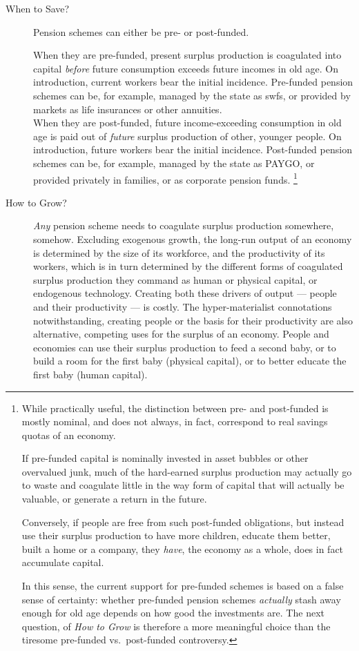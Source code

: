 \begin{description}
	\item[When to Save?]
	Pension schemes can either be pre- or post-funded.

	When they are pre-funded, present surplus production is coagulated into capital \emph{before} future consumption exceeds future incomes in old age.
	On introduction, current workers bear the initial incidence.
	Pre-funded pension schemes can be, for example, managed by the state as \glspl{swf}, or provided by markets as life insurances or other annuities.\\
	When they are post-funded, future income-exceeding consumption in old age is paid out of \emph{future} surplus production of other, younger people.
	On introduction, future workers bear the initial incidence.
	Post-funded pension schemes can be, for example, managed by the state as PAYGO, or provided privately in families, or as corporate pension funds.
	\footnote{
		While practically useful, the distinction between pre- and post-funded is mostly nominal, and does not always, in fact, correspond to real savings quotas of an economy.

		If pre-funded capital is nominally invested in asset bubbles or other overvalued junk, much of the hard-earned surplus production may actually go to waste and coagulate little in the way form of capital that will actually be valuable, or generate a return in the future.

		Conversely, if people are free from such post-funded obligations, but instead use their surplus production to have more children, educate them better, built a home or a company, they \emph{have}, the economy as a whole, does in fact accumulate capital.

		In this sense, the current support for pre-funded schemes is based on a false sense of certainty:
		whether pre-funded pension schemes \emph{actually} stash away enough for old age depends on how good the investments are.
		The next question, of \emph{How to Grow} is therefore a more meaningful choice than the tiresome pre-funded vs.\ post-funded controversy.
	}

	\item[How to Grow?]
	\emph{Any} pension scheme needs to coagulate surplus production somewhere, somehow.
	Excluding exogenous growth, the long-run output of an economy is determined by the size of its workforce, and the productivity of its workers, which is in turn determined by the different forms of coagulated surplus production they command as human or physical capital, or endogenous technology.
	Creating both these drivers of output --- people and their productivity --- is costly.
	The hyper-materialist connotations notwithstanding, creating people or the basis for their productivity are also alternative, competing uses for the surplus of an economy.
	People and economies can use their surplus production to feed a second baby, or to build a room for the first baby (physical capital), or to better educate the first baby (human capital).


\end{description}
